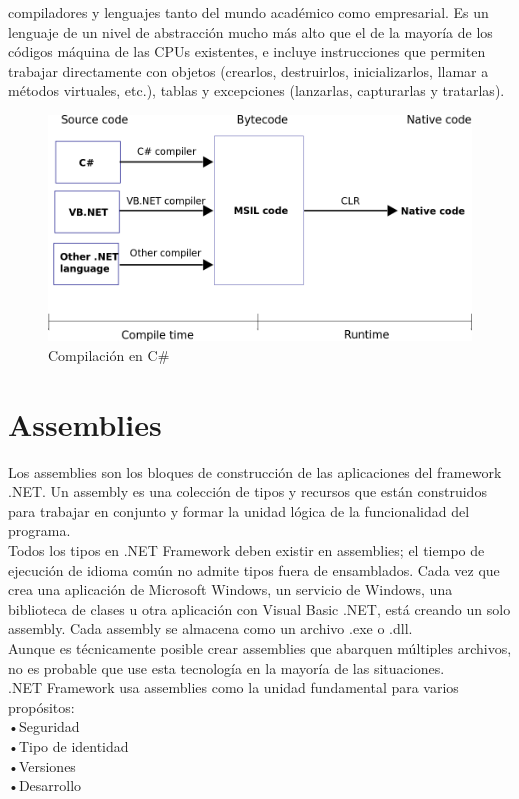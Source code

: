 \documentclass[12pt,a4paper]{report}
\begin{document}
compiladores y lenguajes tanto del mundo académico como empresarial. Es un lenguaje de un nivel de abstracción mucho más alto que el de la mayoría de los códigos máquina de las CPUs existentes, e incluye instrucciones que permiten trabajar directamente con objetos (crearlos, destruirlos, inicializarlos, llamar a métodos virtuales, etc.), tablas y excepciones (lanzarlas, capturarlas y tratarlas).
\begin{figure}[hbtp]
\centering
\includegraphics[width=15cm]{Csh_Imagenes/Compilacion.png}
\caption{Compilación en C\#}
\end{figure}
\section{Assemblies}
Los assemblies son los bloques de construcción de las aplicaciones del framework .NET. Un assembly es una colección de tipos y recursos que están construidos para trabajar en conjunto y formar la unidad lógica de la funcionalidad del programa.\\Todos los tipos en .NET Framework deben existir en assemblies; el tiempo de ejecución de idioma común no admite tipos fuera de ensamblados. Cada vez que crea una aplicación de Microsoft Windows, un servicio de Windows, una biblioteca de clases u otra aplicación con Visual Basic .NET, está creando un solo assembly. Cada assembly se almacena como un archivo .exe o .dll.\\Aunque es técnicamente posible crear assemblies que abarquen múltiples archivos, no es probable que use esta tecnología en la mayoría de las situaciones.\\.NET Framework usa assemblies como la unidad fundamental para varios propósitos:\\•Seguridad\\•Tipo de identidad\\•Versiones\\•Desarrollo
\end{document}
